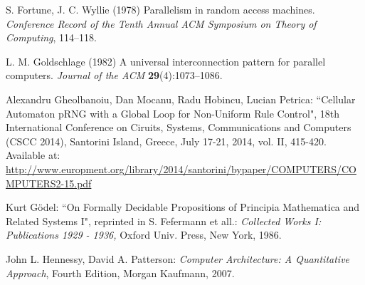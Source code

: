 {\begin{thebibliography}{}
 S. Fortune,  J. C. Wyllie (1978)  Parallelism in random access machines. {\em Conference Record of the Tenth Annual ACM Symposium on Theory of Computing},  114--118.

 L. M. Goldschlage (1982)  A universal interconnection pattern for parallel computers. {\em Journal of the ACM} {\bf 29}(4):1073--1086.

 Alexandru Gheolbanoiu, Dan Mocanu, Radu Hobincu, Lucian Petrica: ``Cellular Automaton pRNG with a Global Loop for Non-Uniform Rule Control", 18th International Conference on Ciruits, Systems, Communications and Computers (CSCC 2014), Santorini Island, Greece, July 17-21, 2014, vol. II, 415-420. Available at:  \url{http://www.europment.org/library/2014/santorini/bypaper/COMPUTERS/COMPUTERS2-15.pdf}


 Kurt G\"{o}del: ``On Formally Decidable Propositions of
 Principia Mathematica and Related Systems I", reprinted in S. Fefermann et
 all.: {\em Collected Works I: Publications 1929 - 1936,} Oxford Univ. Press,
 New York, 1986.






 John L. Hennessy, David A. Patterson: {\em Computer Architecture: A Quantitative Approach}, Fourth Edition, Morgan Kaufmann, 2007.


\end{thebibliography}}
